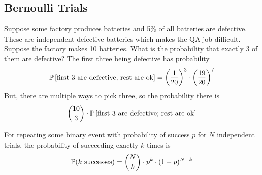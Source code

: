 \subsection{Bernoulli Trials}
Suppose some factory produces batteries and 5\% of all batteries are defective. These are independent defective batteries which makes the QA job difficult. Suppose the factory makes 10 batteries. What is the probability that exactly 3 of them are defective? The first three being defective has probability
\begin{align}
    \mathbb{P}\left[ \text{first 3 are defective; rest are ok} \right] = \left( \dfrac{1}{20} \right)^3 \cdot \left( \dfrac{19}{20} \right)^7
\end{align}
But, there are multiple ways to pick three, so the probability there is
\begin{align}
    \binom{10}{3} \cdot \mathbb{P}\left[ \text{first 3 are defective; rest are ok} \right]
\end{align}
\begin{definition}
    For repeating some binary event with probability of success $p$ for $N$ independent trials, the probability of succeeding exactly $k$ times is
    \begin{align}
        \mathbb{P}(k \text{ successes}) = \binom{N}{k} \cdot p^k \cdot (1-p)^{N-k}
    \end{align}
\end{definition}
